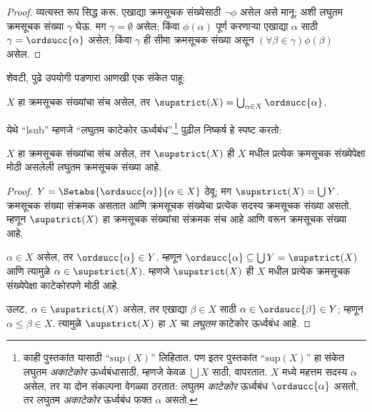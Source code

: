 \documentclass[../../../include/open-logic-section]{subfiles}
\begin{document}
\begin{proof}
व्यत्यस्त रूप सिद्ध करू. एखाद्या क्रमसूचक संख्येसाठी $\lnot\phi$ असेल असे मानू; अशी लघुतम क्रमसूचक संख्या $\gamma$ घेऊ. मग $\gamma = \emptyset$ असेल; किंवा $\phi(\alpha)$ पूर्ण करणाऱ्या एखाद्या $\alpha$ साठी $\gamma = \ordsucc{\alpha}$ असेल; किंवा $\gamma$ ही सीमा क्रमसूचक संख्या असून $(\forall
\beta \in \gamma)\phi(\beta)$ असेल.
\end{proof}
\noindent
शेवटी, पुढे उपयोगी पडणारा आणखी एक संकेत पाहू:

\begin{defn}
$X$ हा क्रमसूचक संख्यांचा संच असेल, तर $\supstrict(X) = \bigcup_{\alpha
\in X} \ordsucc{\alpha}$.
\end{defn}
\noindent
येथे ``lsub'' म्हणजे ``लघुतम काटेकोर ऊर्ध्वबंध''.\footnote{काही पुस्तकांत यासाठी ``$\text{sup}(X)$'' लिहितात. पण इतर पुस्तकांत ``$\text{sup}(X)$'' हा संकेत लघुतम \emph{अकाटेकोर} ऊर्ध्वबंधासाठी, म्हणजे केवळ $\bigcup X$ साठी, वापरतात. $X$ मध्ये महत्तम सदस्य $\alpha$ असेल, तर या दोन संकल्पना वेगळ्या ठरतात: लघुतम \emph{काटेकोर} ऊर्ध्वबंध $\ordsucc{\alpha}$ असतो, तर लघुतम \emph{अकाटेकोर} ऊर्ध्वबंध फक्त $\alpha$ असतो.} पुढील निष्कर्ष हे स्पष्ट करतो:

\begin{prop}
$X$ हा क्रमसूचक संख्यांचा संच असेल, तर $\supstrict(X)$ ही $X$ मधील प्रत्येक क्रमसूचक संख्येपेक्षा मोठी असलेली लघुतम क्रमसूचक संख्या आहे.
\end{prop}

\begin{proof}
$Y = \Setabs{\ordsucc{\alpha}}{\alpha \in X}$ ठेवू; मग $\supstrict(X) = \bigcup Y$. क्रमसूचक संख्या संक्रमक असतात आणि क्रमसूचक संख्येचा प्रत्येक सदस्य क्रमसूचक संख्या असतो. म्हणून $\supstrict(X)$ हा क्रमसूचक संख्यांचा संक्रमक संच आहे आणि  वरून क्रमसूचक संख्या आहे.

$\alpha \in X$ असेल, तर $\ordsucc{\alpha} \in Y$. म्हणून $\ordsucc{\alpha}
\subseteq \bigcup Y = \supstrict(X)$ आणि त्यामुळे $\alpha \in
\supstrict(X)$. म्हणजे $\supstrict(X)$ ही $X$ मधील प्रत्येक क्रमसूचक संख्येपेक्षा काटेकोरपणे मोठी आहे.

उलट, $\alpha \in \supstrict(X)$ असेल, तर एखाद्या $\beta \in X$ साठी $\alpha \in
\ordsucc{\beta} \in Y$; म्हणून $\alpha \leq
\beta \in X$. त्यामुळे $\supstrict(X)$ हा $X$ चा \emph{लघुतम} काटेकोर ऊर्ध्वबंध आहे.
\end{proof}
\end{document}
